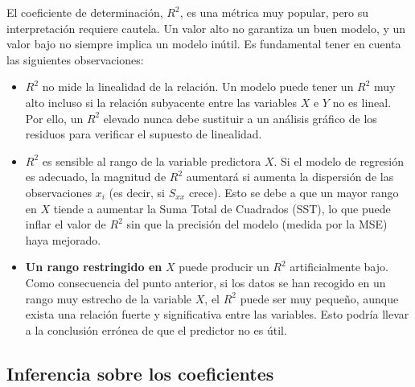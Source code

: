 \documentclass[
  letterpaper,
  DIV=11,
  numbers=noendperiod]{scrreprt}
\begin{document}
\begin{tcolorbox}[enhanced jigsaw, leftrule=.75mm, breakable, colbacktitle=quarto-callout-caution-color!10!white, bottomrule=.15mm, colframe=quarto-callout-caution-color-frame, toprule=.15mm, colback=white, coltitle=black, bottomtitle=1mm, left=2mm, title=\textcolor{quarto-callout-caution-color}{\faFire}\hspace{0.5em}{Interpretación de R²}, opacityback=0, arc=.35mm, opacitybacktitle=0.6, toptitle=1mm, titlerule=0mm, rightrule=.15mm]

El coeficiente de determinación, \(R^2\), es una métrica muy popular,
pero su interpretación requiere cautela. Un valor alto no garantiza un
buen modelo, y un valor bajo no siempre implica un modelo inútil. Es
fundamental tener en cuenta las siguientes observaciones:

\begin{itemize}
\item
  \(R^2\) no mide la linealidad de la relación. Un modelo puede tener un
  \(R^2\) muy alto incluso si la relación subyacente entre las variables
  \(X\) e \(Y\) no es lineal. Por ello, un \(R^2\) elevado nunca debe
  sustituir a un análisis gráfico de los residuos para verificar el
  supuesto de linealidad.
\item
  \(R^2\) es sensible al rango de la variable predictora \(X\). Si el
  modelo de regresión es adecuado, la magnitud de \(R^2\) aumentará si
  aumenta la dispersión de las observaciones \(x_i\) (es decir, si
  \(S_{xx}\) crece). Esto se debe a que un mayor rango en \(X\) tiende a
  aumentar la Suma Total de Cuadrados (SST), lo que puede inflar el
  valor de \(R^2\) sin que la precisión del modelo (medida por la MSE)
  haya mejorado.
\item
  \textbf{Un rango restringido en} \(X\) puede producir un \(R^2\)
  artificialmente bajo. Como consecuencia del punto anterior, si los
  datos se han recogido en un rango muy estrecho de la variable \(X\),
  el \(R^2\) puede ser muy pequeño, aunque exista una relación fuerte y
  significativa entre las variables. Esto podría llevar a la conclusión
  errónea de que el predictor no es útil.
\end{itemize}

\end{tcolorbox}

\subsection{Inferencia sobre los
coeficientes}\label{inferencia-sobre-los-coeficientes}
\end{document}
